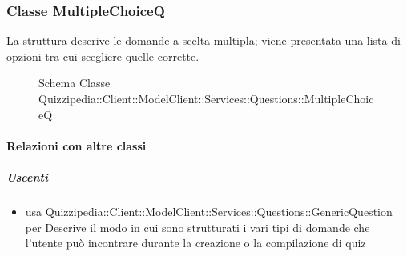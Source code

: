 \subsubsection{Classe MultipleChoiceQ}
La struttura descrive le domande a scelta multipla; viene presentata una lista di opzioni tra cui scegliere quelle corrette.
\begin{figure}[H]
\centering
\noindent{}
\caption[Schema Classe MultipleChoiceQ]{Schema Classe Quizzipedia::Client::ModelClient::Services::Questions::MultipleChoiceQ}
\end{figure}
\paragraph{Relazioni con altre classi}
\subparagraph{Uscenti}
\begin{itemize}
\item usa Quizzipedia::Client::ModelClient::Services::Questions::GenericQuestion per Descrive il modo in cui sono strutturati i vari tipi di domande che l'utente può incontrare durante la creazione o la compilazione di quiz
\end{itemize}

